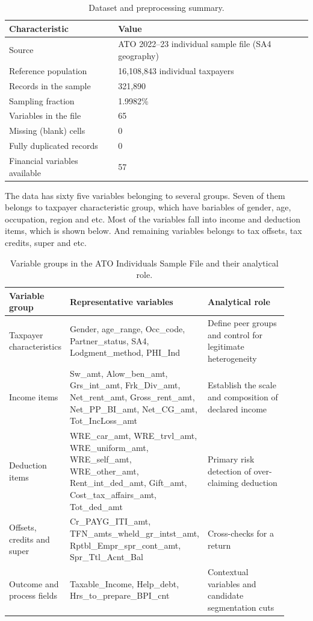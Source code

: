 \begin{table}[H]
    \centering
    \caption{Dataset and preprocessing summary.}
    \label{tab:dataset}
    \begin{tabular}{ll}
        \toprule
        Characteristic & Value \\
        \midrule
        Source & ATO 2022--23 individual sample file (SA4 geography) \\
        Reference population & 16,108,843 individual taxpayers \\
        Records in the sample & 321,890 \\
        Sampling fraction & 1.9982\% \\
        Variables in the file & 65 \\
        Missing (blank) cells & 0 \\
        Fully duplicated records & 0 \\
        Financial variables available & 57 \\
        \bottomrule
    \end{tabular}
\end{table}

The data has sixty five variables belonging to several groups. Seven of them belongs to taxpayer characteristic group, which have bariables of gender, age, occupation, region and etc. Most of the variables fall into income and deduction items, which is shown below. And remaining variables belongs to tax offsets, tax credits, super and etc.

\begin{table}[H]
    \centering
    \caption{Variable groups in the ATO Individuals Sample File and their analytical role.}
    \label{tab:vargroups}
    \small
    \begin{tabular}{p{0.2\linewidth} p{0.42\linewidth} p{0.3\linewidth}}
        \toprule
        Variable group & Representative variables & Analytical role \\
        \midrule
        Taxpayer characteristics & Gender, age\_range, Occ\_code, Partner\_status, SA4, Lodgment\_method, PHI\_Ind & Define peer groups and control for legitimate heterogeneity \\
        Income items & Sw\_amt, Alow\_ben\_amt, Grs\_int\_amt, Frk\_Div\_amt, Net\_rent\_amt, Gross\_rent\_amt, Net\_PP\_BI\_amt, Net\_CG\_amt, Tot\_IncLoss\_amt & Establish the scale and composition of declared income \\
        Deduction items & WRE\_car\_amt, WRE\_trvl\_amt, WRE\_uniform\_amt, WRE\_self\_amt, WRE\_other\_amt, Rent\_int\_ded\_amt, Gift\_amt, Cost\_tax\_affairs\_amt, Tot\_ded\_amt & Primary risk detection of over-claiming deduction \\
        Offsets, credits and super & Cr\_PAYG\_ITI\_amt, TFN\_amts\_wheld\_gr\_intst\_amt, Rptbl\_Empr\_spr\_cont\_amt, Spr\_Ttl\_Acnt\_Bal & Cross-checks for a return \\
        Outcome and process fields & Taxable\_Income, Help\_debt, Hrs\_to\_prepare\_BPI\_cnt & Contextual variables and candidate segmentation cuts \\
        \bottomrule
    \end{tabular}
\end{table}

